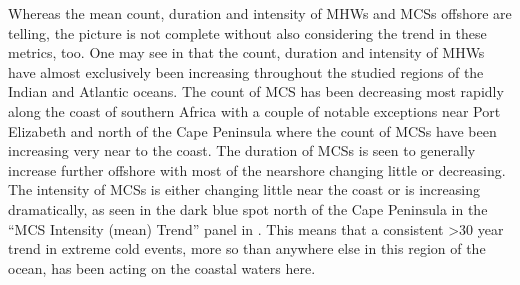 \documentclass[a4paper,10pt,review]{elsarticle}
\begin{document}
Whereas the mean count, duration and intensity of MHWs and MCSs offshore are telling, the picture is not complete without also considering the trend in these metrics, too. One may see in  that the count, duration and intensity of MHWs have almost exclusively been increasing throughout the studied regions of the Indian and Atlantic oceans. The count of MCS has been decreasing most rapidly along the coast of southern Africa with a couple of notable exceptions near Port Elizabeth and north of the Cape Peninsula where the count of MCSs have been increasing very near to the coast. The duration of MCSs is seen to generally increase further offshore with most of the nearshore changing little or decreasing. The intensity of MCSs is either changing little near the coast or is increasing dramatically, as seen in the dark blue spot north of the Cape Peninsula in the ``MCS Intensity (mean) Trend'' panel in . This means that a consistent >30 year trend in extreme cold events, more so than anywhere else in this region of the ocean, has been acting on the coastal waters here.

\end{document}
